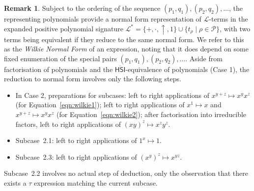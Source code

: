 \documentclass[eqnor,reqno]{amsart}
\theoremstyle{plain}
\theoremstyle{definition}
\newtheorem{remark}[thm]{Remark}
\newcommand{\HSI}{\textsf{HSI}}
\begin{document}
\begin{remark}\label{rem:normalform}
Subject to the ordering of the sequence $(p_1,q_1),(p_2,q_2),\dots$, the representing polynomials provide a normal form representation of $\mathscr{L}$-terms in the expanded positive polynomial signature $\mathscr{L}^*=\{+,\cdot,\uparrow,1\}\cup \{t_{\rho}\mid \rho\in \mathcal{P}\}$, with two terms being equivalent if they reduce to the same normal form.  We refer to this as the \emph{Wilkie Normal Form} of an expression, noting that it does depend on some fixed enumeration of the special pairs $(p_1,q_1),(p_2,q_2),\dots$.  Aside from factorisation of polynomials and the $\overline{\HSI}$-equivalence of polynomials (Case 1), the reduction to normal form involves only the following steps.
\begin{itemize}
\item In Case 2, preparations for subcases: left to right applications of $x^{y+z}\mapsto x^yx^z$ (for Equation~\eqref{eqn:wilkie1}); left to right applications of $x^1\mapsto x$ and $x^{y+z}\mapsto x^yx^z$ (for Equation~\eqref{eqn:wilkie2}); after factorisation into irreducible factors, left to right applications of $(xy)^z\mapsto x^zy^z$.
\item Subcase~2.1: left to right applications of $1^x\mapsto 1$.
\item Subcase~2.3: left to right applications of $(x^y)^z\mapsto x^{yz}$.
\end{itemize}
Subcase~2.2  involves no actual step of deduction, only the observation that there exists a $\tau$ expression matching the current subcase. 
\end{remark}
\end{document}
